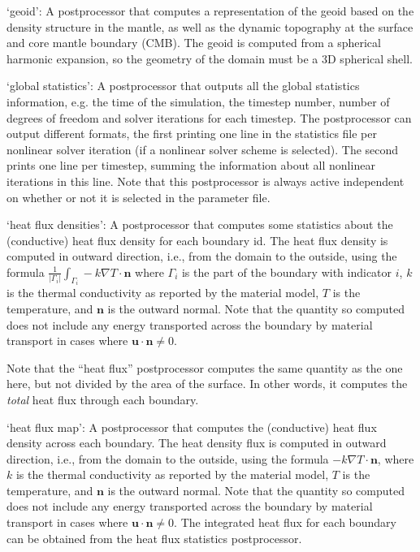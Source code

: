 \begin{itemize}
`geoid': A postprocessor that computes a representation of the geoid based on the density structure in the mantle, as well as the dynamic topography at the surface and core mantle boundary (CMB). The geoid is computed from a spherical harmonic expansion, so the geometry of the domain must be a 3D spherical shell.

`global statistics': A postprocessor that outputs all the global statistics information, e.g. the time of the simulation, the timestep number, number of degrees of freedom and solver iterations for each timestep. The postprocessor can output different formats, the first printing one line in the statistics file per nonlinear solver iteration (if a nonlinear solver scheme is selected). The second prints one line per timestep, summing the information about all nonlinear iterations in this line. Note that this postprocessor is always active independent on whether or not it is selected in the parameter file.

`heat flux densities': A postprocessor that computes some statistics about the (conductive) heat flux density for each boundary id. The heat flux density is computed in outward direction, i.e., from the domain to the outside, using the formula $\frac{1}{|\Gamma_i|} \int_{\Gamma_i} -k \nabla T \cdot \mathbf n$ where $\Gamma_i$ is the part of the boundary with indicator $i$, $k$ is the thermal conductivity as reported by the material model, $T$ is the temperature, and $\mathbf n$ is the outward normal. Note that the quantity so computed does not include any energy transported across the boundary by material transport in cases where $\mathbf u \cdot \mathbf n \neq 0$.

Note that the ``heat flux'' postprocessor computes the same quantity as the one here, but not divided by the area of the surface. In other words, it computes the \textit{total} heat flux through each boundary.

`heat flux map': A postprocessor that computes the (conductive) heat flux density across each boundary. The heat density flux is computed in outward direction, i.e., from the domain to the outside, using the formula $-k \nabla T \cdot \mathbf n$, where $k$ is the thermal conductivity as reported by the material model, $T$ is the temperature, and $\mathbf n$ is the outward normal. Note that the quantity so computed does not include any energy transported across the boundary by material transport in cases where $\mathbf u \cdot \mathbf n \neq 0$. The integrated heat flux for each boundary can be obtained from the heat flux statistics postprocessor.


\end{itemize}

